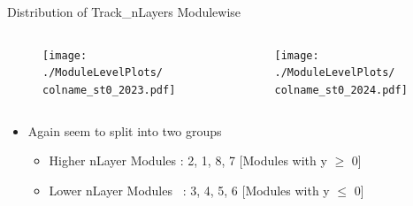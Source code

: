 \begin{frame}{Distribution of Track\_nLayers Modulewise}
    \newcommand{\colname}{Track_nLayers}
    \begin{columns}
        \begin{column}{0.6\linewidth}
            \begin{figure}
                \centering
                \texttt{[image: ./ModuleLevelPlots/\\colname\_st0\_2023.pdf]}
            \end{figure}
        \end{column}
        \begin{column}{0.6\linewidth}
            \begin{figure}
                \centering
                \texttt{[image: ./ModuleLevelPlots/\\colname\_st0\_2024.pdf]}
            \end{figure}
        \end{column}
    \end{columns}

    \begin{itemize}
        \small
        \item Again seem to split into two groups
        \begin{itemize}
            \item Higher nLayer Modules : 2, 1, 8, 7 [Modules with y $\geq$ 0]
            \item Lower nLayer Modules \ : 3, 4, 5, 6  [Modules with y $\leq$ 0]
        \end{itemize}
    \end{itemize}
\end{frame}

